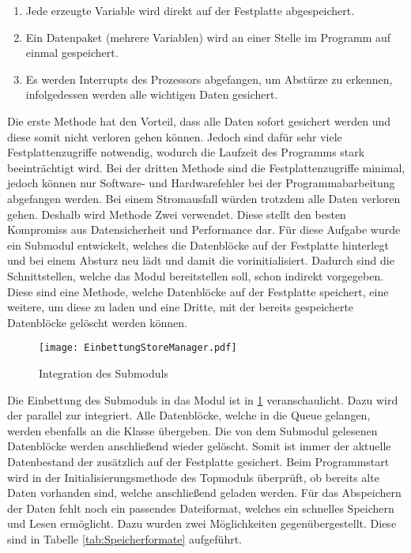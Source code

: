 \begin{enumerate}
\item Jede erzeugte Variable wird direkt auf der Festplatte abgespeichert.
\item Ein Datenpaket (mehrere Variablen) wird an einer Stelle im Programm auf
einmal gespeichert.
\item Es werden Interrupts des Prozessors abgefangen, um Abst{\"u}rze zu erkennen,
infolgedessen werden alle wichtigen Daten gesichert.
\end{enumerate}

Die erste Methode hat den Vorteil, dass alle Daten sofort gesichert werden und
diese somit nicht verloren gehen k{\"o}nnen. Jedoch sind daf{\"u}r sehr viele
Festplattenzugriffe notwendig, wodurch die Laufzeit des Programms stark
beeintr{\"a}chtigt wird. Bei der dritten Methode sind die Festplattenzugriffe
minimal, jedoch k{\"o}nnen nur Software- und Hardwarefehler bei der
Programmabarbeitung abgefangen werden. Bei einem Stromausfall w{\"u}rden
trotzdem alle Daten verloren gehen. Deshalb wird Methode Zwei verwendet. Diese
stellt den besten Kompromiss aus Datensicherheit und Performance dar. \newline
F{\"u}r diese Aufgabe wurde ein Submodul entwickelt, welches die Datenbl{\"o}cke
auf der Festplatte hinterlegt und bei einem Absturz neu l{\"a}dt und damit die
 vorinitialisiert. Dadurch sind die Schnittstellen,
welche das Modul bereitstellen soll, schon indirekt vorgegeben. Diese sind eine
Methode, welche Datenbl{\"o}cke auf der Festplatte speichert, eine weitere, um
diese zu laden und eine Dritte, mit der bereits gespeicherte Datenbl{\"o}cke
gel{\"o}scht werden k{\"o}nnen.

\begin{figure}[H]
\centering
\texttt{[image: EinbettungStoreManager.pdf]}
\caption{Integration des Submoduls }
\label{fig:EinbettungStoreManager}
\end{figure}

Die Einbettung des Submoduls  in das Modul  ist
in \ref{fig:EinbettungStoreManager} veranschaulicht. Dazu wird der
 parallel zur  integriert. Alle
Datenbl{\"o}cke, welche in die Queue gelangen, werden ebenfalls an die
Klasse  {\"u}bergeben. Die von dem Submodul 
gelesenen Datenbl{\"o}cke werden anschließend wieder gel{\"o}scht. Somit ist immer der
aktuelle Datenbestand der 
zus{\"a}tzlich auf der Festplatte gesichert. Beim Programmstart wird in der
Initialisierungsmethode des Topmoduls {\"u}berpr{\"u}ft, ob bereits alte Daten vorhanden
sind, welche anschlie{\ss}end geladen werden. \newline
F{\"u}r das Abspeichern der
Daten fehlt noch ein passendes Dateiformat, welches ein schnelles Speichern und
Lesen erm{\"o}glicht. Dazu wurden zwei M{\"o}glichkeiten gegen{\"u}bergestellt. Diese sind
in Tabelle \ref{tab:Speicherformate} aufgef{\"u}hrt.

